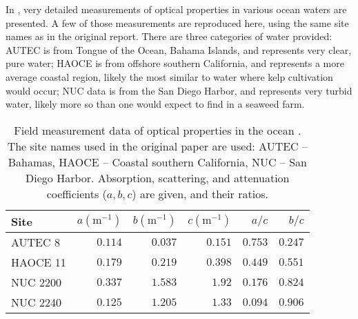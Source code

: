 In \citep{petzold_volume_1972}, very detailed measurements of optical properties in various ocean waters are presented.
A few of those measurements are reproduced here, using the same site names as in the original report.
There are three categories of water provided: AUTEC is from Tongue of the Ocean, Bahama Islands,
and represents very clear, pure water; HAOCE is from offshore southern California, and represents a more average coastal region,
likely the most similar to water where kelp cultivation would occur; NUC data is from the San Diego Harbor, and represents very turbid water,
likely more so than one would expect to find in a seaweed farm.

\begin{table}
  \centering
  \caption{Field measurement data of optical properties in the ocean \cite{petzold_volume_1972}.
    The site names used in the original paper are used: AUTEC -- Bahamas, HAOCE -- Coastal southern California, NUC -- San Diego Harbor.
    Absorption, scattering, and attenuation coefficients ($a,b,c$) are given, and their ratios.
  }
  \begin{tabular}{lrrrrr}
    \toprule
    Site & $a (\mbox{m}^{-1})$ & $b (\mbox{m}^{-1})$ & $c(\mbox{m}^{-1} )$ & $a/c$ & $b/c$ \\
    \midrule
    AUTEC 8 & $0.114$ & $0.037$ & $0.151$ & $0.753$ & $0.247$ \\
    HAOCE 11 & $0.179$ & $0.219$ & $0.398$ & $0.449$ & $0.551$ \\
    NUC 2200 & $0.337$ & $1.583$ & $1.92$ & $0.176$ & $0.824$ \\
    NUC 2240 & $0.125$ & $1.205$ & $1.33$ & $0.094$ & $0.906$ \\
    \bottomrule
  \end{tabular}
  \label{tab:petzold}
\end{table}

